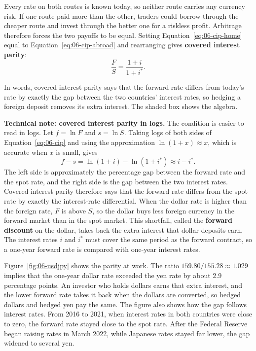 Every rate on both routes is known today, so neither route carries any currency risk. If one route paid more than the other, traders could borrow through the cheaper route and invest through the better one for a riskless profit. Arbitrage therefore forces the two payoffs to be equal. Setting Equation~\eqref{eq:06-cip-home} equal to Equation~\eqref{eq:06-cip-abroad} and rearranging gives \textbf{covered interest parity}:
\begin{equation}
  \frac{F}{S} = \frac{1 + i}{1 + i^*}.
  \label{eq:06-cip}
\end{equation}

In words, covered interest parity says that the forward rate differs from today's rate by exactly the gap between the two countries' interest rates, so hedging a foreign deposit removes its extra interest. The shaded box shows the algebra.

\begin{technote}
\textbf{Technical note: covered interest parity in logs.} The condition is easier to read in logs. Let $f = \ln F$ and $s = \ln S$. Taking logs of both sides of Equation~\eqref{eq:06-cip} and using the approximation $\ln(1+x) \approx x$, which is accurate when $x$ is small, gives
\begin{equation}
  f - s = \ln(1+i) - \ln(1+i^*) \approx i - i^*.
  \label{eq:06-cip-log}
\end{equation}
The left side is approximately the percentage gap between the forward rate and the spot rate, and the right side is the gap between the two interest rates. Covered interest parity therefore says that the forward rate differs from the spot rate by exactly the interest-rate differential. When the dollar rate is higher than the foreign rate, $F$ is above $S$, so the dollar buys less foreign currency in the forward market than in the spot market. This shortfall, called the \textbf{forward discount} on the dollar, takes back the extra interest that dollar deposits earn. The interest rates $i$ and $i^*$ must cover the same period as the forward contract, so a one-year forward rate is compared with one-year interest rates.
\end{technote}


Figure~\ref{fig:06-usdjpy} shows the parity at work. The ratio $159.80/155.28 \approx 1.029$ implies that the one-year dollar rate exceeded the yen rate by about 2.9 percentage points. An investor who holds dollars earns that extra interest, and the lower forward rate takes it back when the dollars are converted, so hedged dollars and hedged yen pay the same. The figure also shows how the gap follows interest rates. From 2016 to 2021, when interest rates in both countries were close to zero, the forward rate stayed close to the spot rate. After the Federal Reserve began raising rates in March 2022, while Japanese rates stayed far lower, the gap widened to several yen.

